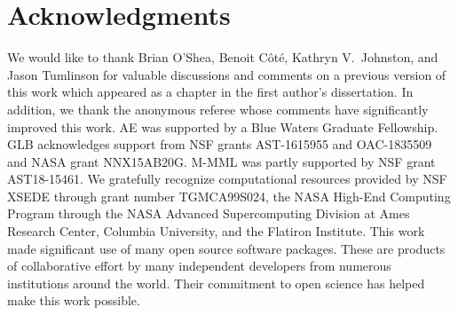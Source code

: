 \documentclass[twocolumn]{aastex62}
\begin{document}
\section*{Acknowledgments} We would like to thank Brian O'Shea, Benoit C{\^o}t{\'e}, Kathryn V.~Johnston, and Jason Tumlinson for valuable discussions and comments on a previous version of this work which appeared as a chapter in the first author's dissertation. In addition, we thank the anonymous referee whose comments have significantly improved this work. AE was supported by a Blue Waters Graduate Fellowship. GLB acknowledges support from NSF grants AST-1615955 and OAC-1835509 and NASA grant NNX15AB20G. M-MML was partly supported by NSF grant AST18-15461. We gratefully recognize computational resources provided by NSF XSEDE through grant number TGMCA99S024, the NASA High-End Computing Program through the NASA Advanced Supercomputing Division at Ames Research Center, Columbia University, and the Flatiron Institute. This work made significant use of many open source software packages. These are products of collaborative effort by many independent developers from numerous institutions around the world. Their commitment to open science has helped make this work possible. 






%
%




\end{document}
